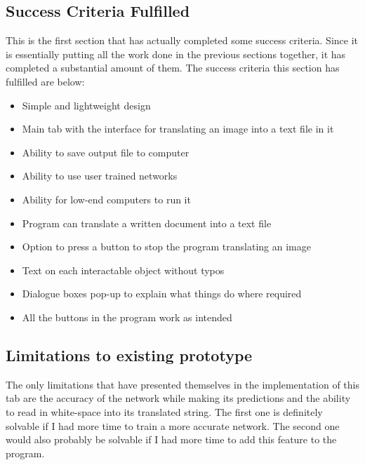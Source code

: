 \documentclass{report}
\begin{document}
\subsection{Success Criteria Fulfilled}
This is the first section that has actually completed some success criteria. Since it is essentially putting all the work done in the previous sections together, it has completed a substantial amount of them.
\newline
The success criteria this section has fulfilled are below:
\begin{itemize}
    \item Simple and lightweight design
    \item Main tab with the interface for translating an image into a text file in it
    \item Ability to save output file to computer
    \item Ability to use user trained networks
    \item Ability for low-end computers to run it
    \item Program can translate a written document into a text file
    \item Option to press a button to stop the program translating an image
    \item Text on each interactable object without typos
    \item Dialogue boxes pop-up to explain what things do where required
    \item All the buttons in the program work as intended
\end{itemize}
\subsection{Limitations to existing prototype}
The only limitations that have presented themselves in the implementation of this tab are the accuracy of the network while making its predictions and the ability to read in white-space into its translated string. The first one is definitely solvable if I had more time to train a more accurate network. The second one would also probably be solvable if I had more time to add this feature to the program.
\newpage
\end{document}
